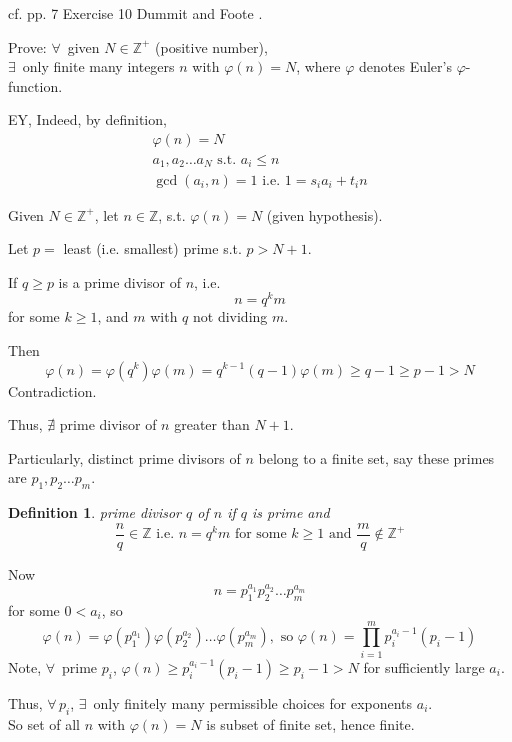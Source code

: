\documentclass[10pt]{amsart}
\newtheorem{definition}{Definition}
\newcommand{\exercisehead}[1]
  { \smallskip
   \noindent{\small\bf Exercise #1.}
  }
\begin{document}
\begin{multicols*}{2}
\exercisehead{10}
cf. pp. 7 Exercise 10 Dummit and Foote \cite{DuFo2003}.  

Prove: $\forall \, $ given $N \in \mathbb{Z}^+$ (positive number), \\
$\exists \, $ only finite many integers $n$ with $\varphi(n) = N$, where $\varphi$ denotes Euler's $\varphi$-function.  

EY, Indeed, by definition, \\
\[
\begin{gathered}
\varphi(n) = N \\
a_1, a_2 \dots a_N \text{ s.t. } a_i \leq n \\
\gcd(a_i,n)=1 \text{ i.e. } 1 = s_i a_i + t_i n 
\end{gathered}
\]


Given $N \in \mathbb{Z}^+$, let $n \in \mathbb{Z}$, s.t. $\varphi(n) = N$ (given hypothesis).  

Let $p= $ least (i.e. smallest) prime s.t. $p > N+1$.  

If $q\geq p$ is a prime divisor of $n$, i.e. 
\[
n = q^k m 
\]
for some $k\geq 1$, and $m$ with $q$ not dividing $m$.  

Then 
\[
\varphi(n) = \varphi(q^k) \varphi(m) = q^{k-1}(q-1) \varphi(m) \geq q-1 \geq p -1 > N
\]
Contradiction.  

Thus, $\nexists$ prime divisor of $n$ greater than $N+1$.  

Particularly, distinct prime divisors of $n$ belong to a finite set, say these primes are $p_1,p_2 \dots p_m$.  

\begin{definition}
	prime divisor $q$ of $n$ if $q$ is prime and 
	\begin{equation}
	 \frac{n}{q} \in \mathbb{Z} \text{ i.e. } n =q^k m \text{ for some } k \geq 1 \text{ and } \frac{m}{q} \notin \mathbb{Z}^+
	\end{equation}
\end{definition}

Now
\[
n=p_1^{a_1}p_2^{a_2} \dots p_m^{a_m} 
\]
for some $0<a_i$, so 
\[
\varphi(n) = \varphi(p_1^{a_1}) \varphi(p_2^{a_2}) \dots \varphi( p_m^{a_m}), \text{ so } \varphi(n) = \prod_{i=1}^m p_i^{ a_i -1} (p_i-1)
\]
Note, $\forall \, $ prime $p_i$, $\varphi(n) \geq p_i^{a_i -1}(p_i-1) \geq p_i - 1 > N$ for sufficiently large $a_i$.  

Thus, $\forall \, p_i$, $\exists \, $ only finitely many permissible choices for exponents $a_i$.  \\
So set of all $n$ with $\varphi(n) = N$ is subset of finite set, hence finite.  


\end{multicols*}
\end{document}
